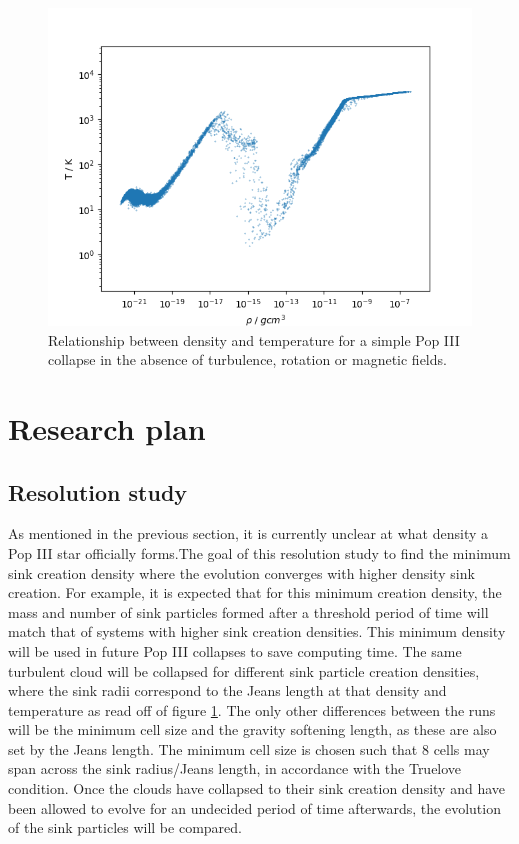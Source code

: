 \documentclass[11pt]{article}
\begin{document}
\begin{figure}[!htb]
         \centering
		\includegraphics[width=12cm]{cooling.png}
		\caption{Relationship between density and temperature for a simple Pop III collapse in the absence of turbulence, rotation or magnetic fields.}
		\label{fig:cooling}
\end{figure}




\clearpage

\section{Research plan}
\subsection{Resolution study}
As mentioned in the previous section, it is currently unclear at what density a Pop III star officially forms.The goal of this resolution study to find  the minimum sink creation density where the evolution converges with higher density sink creation. For example, it is expected that for this minimum creation density, the mass and number of sink particles formed after a threshold period of time will match that of systems with higher sink creation densities. This minimum density will be used in future Pop III collapses to save computing time. The same turbulent cloud will be collapsed for different sink particle creation densities, where the sink radii correspond to the Jeans length at that density and temperature as read off of figure \ref{fig:cooling}. The only other differences between the runs will be the minimum cell size and the gravity softening length, as these are also set by the Jeans length. The minimum cell size is chosen such that 8 cells may span across the sink radius/Jeans length, in accordance with the Truelove condition. Once the clouds have collapsed to their sink creation density and have been allowed to evolve for an undecided period of time afterwards, the evolution of the sink particles will be compared. 
\end{document}
